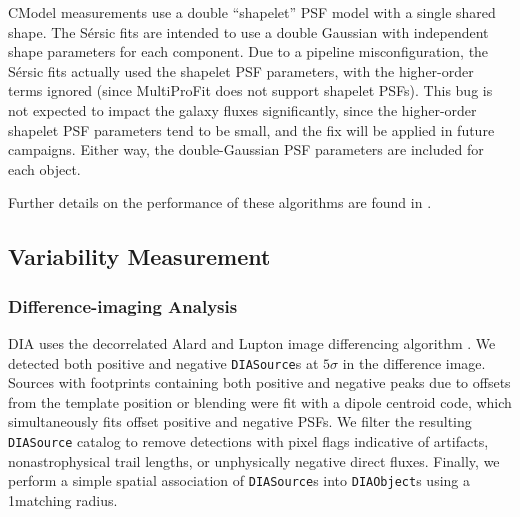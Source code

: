 CModel measurements use a double ``shapelet'' \citep[][]{2003ARA&A..41..645R} PSF model with a single shared shape.
The S\'ersic fits are intended to use a double Gaussian with independent shape parameters for each component.
Due to a pipeline misconfiguration, the S\'ersic fits actually used the shapelet PSF parameters, with the higher-order terms ignored (since MultiProFit does not support shapelet PSFs).
This bug is not expected to impact the galaxy fluxes significantly, since the higher-order shapelet PSF parameters tend to be small, and the fix will be applied in future campaigns.
Either way, the double-Gaussian PSF parameters are included for each object.

Further details on the performance of these algorithms are found in .

\subsection{Variability Measurement}
\subsubsection{Difference-imaging Analysis}
\label{ssec:diffim_analysis}
\gls{DIA} uses the decorrelated Alard and Lupton image differencing algorithm \citep[][]{DMTN-021}.
We detected both positive and negative \texttt{DIASource}s at $5\sigma$ in the difference image.
Sources with footprints containing both positive and negative peaks due to offsets from the template position or blending were fit with a dipole centroid code, which simultaneously fits offset positive and negative PSFs.
We filter the resulting \texttt{DIASource} catalog to remove detections with pixel flags indicative of artifacts, nonastrophysical trail lengths, or unphysically negative direct fluxes.
Finally, we perform a simple spatial association of \texttt{DIASource}s into \texttt{DIAObject}s using a 1\farcs matching radius.

